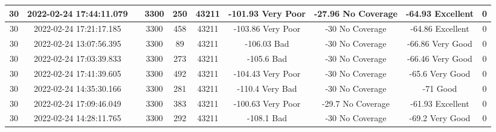 \begin{longtable*}{|c|c|c|c|c|c|c|c|c|c|}
30&2022-02-24 17:44:11.079&&3300&250&43211& -101.93   Very Poor   & -27.96    No Coverage & -64.93    Excellent   & 0\\\hline
{}30&2022-02-24 17:21:17.185&&3300&458&43211& -103.86   Very Poor   & -30       No Coverage & -64.86    Excellent   & 0\\\hline
{}30&2022-02-24 13:07:56.395&&3300&89&43211& -106.03   Bad         & -30       No Coverage & -66.86    Very Good   & 0\\\hline
{}30&2022-02-24 17:03:39.833&&3300&273&43211& -105.6    Bad         & -30       No Coverage & -66.46    Very Good   & 0\\\hline
{}30&2022-02-24 17:41:39.605&&3300&492&43211& -104.43   Very Poor   & -30       No Coverage & -65.6     Very Good   & 0\\\hline
{}30&2022-02-24 14:35:30.166&&3300&281&43211& -110.4    Very Bad    & -30       No Coverage & -71       Good        & 0\\\hline
{}30&2022-02-24 17:09:46.049&&3300&383&43211& -100.63   Very Poor   & -29.7     No Coverage & -61.93    Excellent   & 0\\\hline
{}30&2022-02-24 14:28:11.765&&3300&292&43211& -108.1    Bad         & -30       No Coverage & -69.2     Very Good   & 0\\\hline

\end{longtable*}
